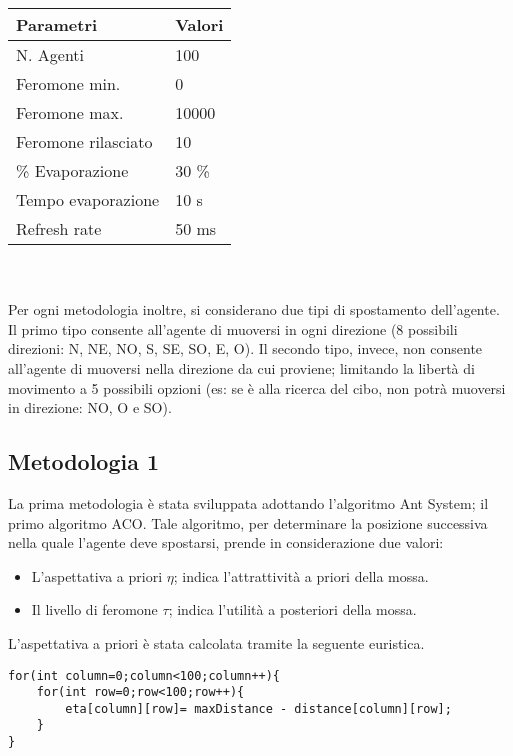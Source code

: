 \documentclass[12pt,a4paper,openright,twoside]{report}
\begin{document}
\begin{tabular}{p{5cm}|p{5cm}} 
	 \textbf{ Parametri} & \textbf{ Valori} \\ \hline
	 N. Agenti & 100 \\
	 Feromone min. & 0 \\
	 Feromone max. & 10000 \\
	 Feromone rilasciato & 10\\
	 \% Evaporazione & 30 \% \\
	 Tempo evaporazione & 10 s \\
	 Refresh rate & 50 ms 
\end{tabular}
\\\\
Per ogni metodologia inoltre, si considerano due tipi di spostamento dell'agente. Il primo tipo consente all'agente di muoversi in ogni direzione (8 possibili direzioni: N, NE, NO, S, SE, SO, E, O). Il secondo tipo, invece, non consente all'agente di muoversi nella direzione da cui proviene; limitando la libertà di movimento a 5 possibili opzioni (es: se è alla ricerca del cibo, non potrà muoversi in direzione: NO, O e SO).
\subsection{Metodologia 1}

La prima metodologia è stata sviluppata adottando l'algoritmo Ant System; il primo algoritmo ACO.
Tale algoritmo, per determinare la posizione successiva nella quale l'agente deve spostarsi, prende in considerazione due valori:

\begin{itemize}
	\item L'aspettativa a priori $\eta$; indica l'attrattività a priori della mossa.
	\item Il livello di feromone $\tau$; indica l'utilità a posteriori della mossa.
\end{itemize}

L'aspettativa a priori è stata calcolata tramite la seguente euristica. \\

\begin{verbatim}
for(int column=0;column<100;column++){
    for(int row=0;row<100;row++){
        eta[column][row]= maxDistance - distance[column][row];
    }
}
\end{verbatim}
\end{document}
